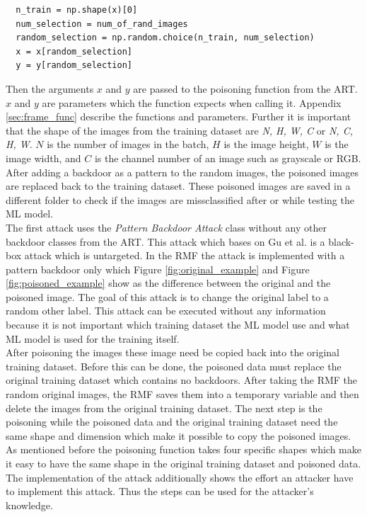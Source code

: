 \begin{lstlisting}
  n_train = np.shape(x)[0]
  num_selection = num_of_rand_images
  random_selection = np.random.choice(n_train, num_selection)
  x = x[random_selection]
  y = y[random_selection]
\end{lstlisting}

Then the arguments $x$ and $y$ are passed to the poisoning function from the ART. $x$ and $y$ are parameters which the function expects when calling it. Appendix \ref{sec:frame_func}
describe the functions and parameters. Further it is important that the shape of the images from the training dataset are \textit{N, H, W, C} or \textit{N, C, H, W}. $N$ is the number of
images in the batch, $H$ is the image height, $W$ is the image width, and $C$ is the channel number of an image such as grayscale or RGB. After adding a backdoor as a pattern to the
random images, the poisoned images are replaced back to the training dataset. These poisoned images are saved in a different folder to check if the images are missclassified after or while
testing the ML model.\\

The first attack uses the \textit{Pattern Backdoor Attack} class without any other backdoor classes from the ART. This attack which bases on Gu et al. \cite{DBLP:journals/corr/abs-1708-06733} is a black-box attack which is untargeted. In the RMF the attack is implemented with a pattern backdoor only which Figure \ref{fig:original_example} and Figure \ref{fig:poisoned_example} show as the
difference between the original and the poisoned image. The goal of this attack is to change the original label to a random other label. This attack can be executed without any
information because it is not important which training dataset the ML model use and what ML model is used for the training itself. \\

After poisoning the images these image need be copied back into the original training dataset. Before this can be done, the poisoned data must replace the original training dataset which contains
no backdoors. After taking the RMF the random original images, the RMF saves them into a temporary variable and then delete the images from the original training dataset. The next step is the
poisoning while the poisoned data and the original training dataset need the same shape and dimension which make it possible to copy the poisoned images. As mentioned before the poisoning
function takes four specific shapes which make it easy to have the same shape in the original training dataset and poisoned data. The implementation of the attack additionally shows the
effort an attacker have to implement this attack. Thus the steps can be used for the attacker's knowledge.

